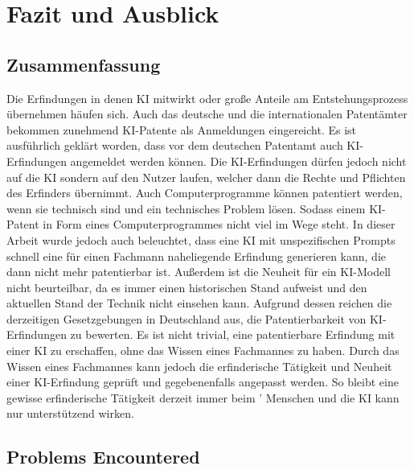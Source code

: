 \chapter{Fazit und Ausblick\label{cha:chapter7}}

\section{Zusammenfassung\label{sec:summary}}

Die Erfindungen in denen KI mitwirkt oder große
Anteile am Entstehungsprozess übernehmen häufen sich.
Auch das deutsche und die internationalen Patentämter 
bekommen zunehmend KI-Patente als Anmeldungen eingereicht.
Es ist ausführlich geklärt worden, dass vor dem deutschen 
Patentamt auch KI-Erfindungen angemeldet werden können.
Die KI-Erfindungen dürfen jedoch nicht auf die KI
sondern auf den Nutzer laufen, welcher dann die Rechte und
Pflichten des Erfinders übernimmt. Auch Computerprogramme
können patentiert werden, wenn sie technisch sind und
ein technisches Problem lösen. Sodass einem KI-Patent
in Form eines Computerprogrammes nicht viel im Wege steht.
In dieser Arbeit wurde jedoch auch beleuchtet, dass
eine KI mit unspezifischen Prompts schnell eine für einen 
Fachmann naheliegende Erfindung generieren kann, die
dann nicht mehr patentierbar ist. Außerdem ist die Neuheit
für ein KI-Modell nicht beurteilbar, da es immer einen historischen
Stand aufweist und den aktuellen Stand der Technik nicht einsehen 
kann. Aufgrund dessen reichen die derzeitigen Gesetzgebungen in Deutschland
aus, die Patentierbarkeit von KI-Erfindungen zu bewerten. Es ist nicht 
trivial, eine patentierbare Erfindung mit einer KI zu erschaffen,
ohne das Wissen eines Fachmannes zu haben. Durch das Wissen eines
Fachmannes kann jedoch die erfinderische Tätigkeit und Neuheit
einer KI-Erfindung geprüft und gegebenenfalls angepasst werden.
So bleibt eine gewisse erfinderische Tätigkeit derzeit immer beim '
Menschen und die KI kann nur unterstützend wirken.

\section{Problems Encountered\label{sec:problems}}

